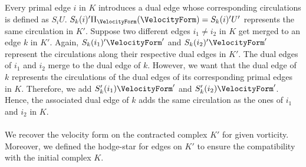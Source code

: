 Every primal edge $i$ in $K$ introduces a dual edge whose corresponding circulations is defined as $S_i U$.
$S_k(i)' \Pi_\VelocityForm(\VelocityForm) = S_k(i)' U'$ represents the same circulation in $K'$.
Suppose two different edges $i_1 \neq i_2$ in $K$ get merged to an edge $k$ in $K'$.
Again, $S_k(i_1)' \VelocityForm'$ and $S_k(i_2)' \VelocityForm'$ represent the circulations along their respective dual edges in $K'$.
The dual edges of $i_1$ and $i_2$ merge to the dual edge of $k$.
However, we want that the dual edge of $k$ represents the circulations of the dual edges of its corresponding primal edges in $K$.
Therefore, we add $S_k'(i_1) \VelocityForm'$ and $S_k'(i_2) \VelocityForm'$.
Hence, the associated dual edge of $k$ adds the same circulation as the ones of $i_1$ and $i_2$ in $K$.

\paragraph*{}
We recover the velocity form on the contracted complex $K'$ for given vorticity.
Moreover, we defined the hodge-star for edges on $K'$ to ensure the compatibility with the initial complex $K$.